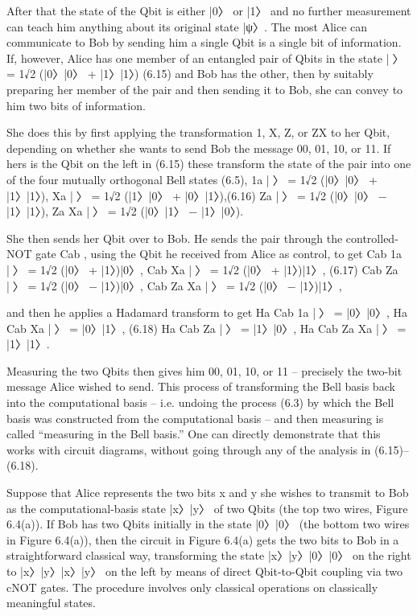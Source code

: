 \documentclass{book}
\begin{document}
After that the state of the Qbit is either |0〉 or |1〉 and no further measurement can teach him anything about its original state |ψ〉. The most Alice can communicate to Bob by sending him a single Qbit is a single bit of information. If, however, Alice has one member of an entangled pair of Qbits in the state |〉 = 1√2 (|0〉|0〉 + |1〉|1〉) (6.15) and Bob has the other, then by suitably preparing her member of the pair and then sending it to Bob, she can convey to him two bits of information.




 She does this by first applying the transformation 1, X, Z, or ZX to her Qbit, depending on whether she wants to send Bob the message 00, 01, 10, or 11. If hers is the Qbit on the left in (6.15) these transform the state of the pair into one of the four mutually orthogonal Bell states (6.5), 
1a |〉 = 1√2 (|0〉|0〉 + |1〉|1〉),
Xa |〉 = 1√2 (|1〉|0〉 + |0〉|1〉),(6.16)
Za |〉 = 1√2 (|0〉|0〉 − |1〉|1〉),
Za Xa |〉 = 1√2 (|0〉|1〉 − |1〉|0〉).



She then sends her Qbit over to Bob. He sends the pair through the controlled-NOT gate Cab , using the Qbit he received from Alice as control, to get
Cab 1a |〉 = 1√2 (|0〉 + |1〉)|0〉,
Cab Xa |〉 = 1√2 (|0〉 + |1〉)|1〉, (6.17)
Cab Za |〉 = 1√2 (|0〉 − |1〉)|0〉,
Cab Za Xa |〉 = 1√2 (|0〉 − |1〉)|1〉,


and then he applies a Hadamard transform to get 
Ha Cab 1a |〉 = |0〉|0〉,
Ha Cab Xa |〉 = |0〉|1〉, (6.18)
Ha Cab Za |〉 = |1〉|0〉,
Ha Cab Za Xa |〉 = |1〉|1〉.



Measuring the two Qbits then gives him 00, 01, 10, or 11 – precisely the two-bit message Alice wished to send. This process of transforming the Bell basis back into the computational basis – i.e. undoing the process (6.3) by which the Bell basis was constructed from the computational basis – and then measuring is called “measuring in the Bell basis.” One can directly demonstrate that this works with circuit diagrams,
without going through any of the analysis in (6.15)–(6.18). 





Suppose that Alice represents the two bits x and y she wishes to transmit to Bob as the computational-basis state |x〉|y〉 of two Qbits (the top two wires, Figure 6.4(a)). If Bob has two Qbits initially in the state |0〉|0〉 (the bottom two wires in Figure 6.4(a)), then the circuit in Figure 6.4(a) gets the two bits to Bob in a straightforward classical way, transforming the state |x〉|y〉|0〉|0〉 on the right to |x〉|y〉|x〉|y〉 on the left by means of direct Qbit-to-Qbit coupling via two cNOT gates. The procedure involves only classical operations on classically meaningful states.
\end{document}
